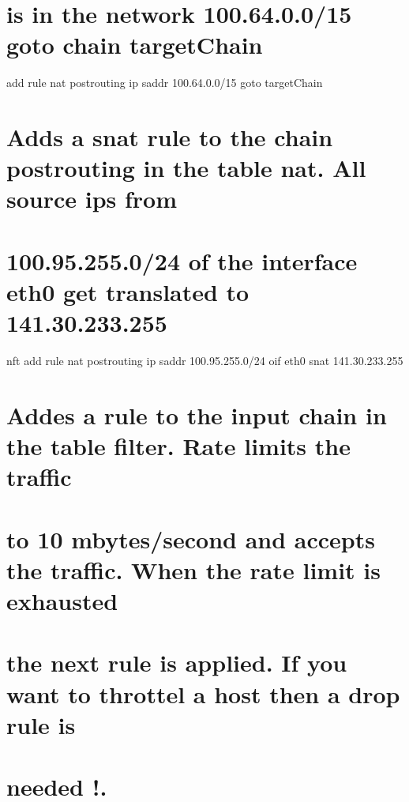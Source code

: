 \begin{itemize}
  \section{is in the network 100.64.0.0/15 goto chain
  targetChain}\label{is-in-the-network-100.64.0.015-goto-chain-targetchain}

  add rule nat postrouting ip saddr 100.64.0.0/15 goto targetChain

  \section{Adds a snat rule to the chain postrouting in the table nat.
  All source ips
  from}\label{adds-a-snat-rule-to-the-chain-postrouting-in-the-table-nat.-all-source-ips-from}

  \section{100.95.255.0/24 of the interface eth0 get translated to
  141.30.233.255}\label{of-the-interface-eth0-get-translated-to-141.30.233.255}

  nft add rule nat postrouting ip saddr 100.95.255.0/24 oif eth0 snat
  141.30.233.255

  \section{Addes a rule to the input chain in the table filter. Rate
  limits the
  traffic}\label{addes-a-rule-to-the-input-chain-in-the-table-filter.-rate-limits-the-traffic}

  \section{to 10 mbytes/second and accepts the traffic. When the rate
  limit is
  exhausted}\label{to-10-mbytessecond-and-accepts-the-traffic.-when-the-rate-limit-is-exhausted}

  \section{the next rule is applied. If you want to throttel a host then
  a drop rule
  is}\label{the-next-rule-is-applied.-if-you-want-to-throttel-a-host-then-a-drop-rule-is}

  \section{needed !.}\label{needed-.}


\end{itemize}
